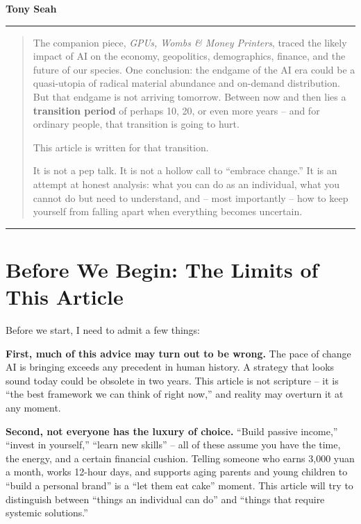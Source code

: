 \textbf{Tony Seah}

\begin{center}\rule{0.5\linewidth}{0.5pt}\end{center}

\begin{quote}
The companion piece, \emph{GPUs, Wombs \& Money Printers}, traced the
likely impact of AI on the economy, geopolitics, demographics, finance,
and the future of our species. One conclusion: the endgame of the AI era
could be a quasi-utopia of radical material abundance and on-demand
distribution. But that endgame is not arriving tomorrow. Between now and
then lies a \textbf{transition period} of perhaps 10, 20, or even more
years -- and for ordinary people, that transition is going to hurt.

This article is written for that transition.

It is not a pep talk. It is not a hollow call to ``embrace change.'' It
is an attempt at honest analysis: what you can do as an individual, what
you cannot do but need to understand, and -- most importantly -- how to
keep yourself from falling apart when everything becomes uncertain.
\end{quote}

\begin{center}\rule{0.5\linewidth}{0.5pt}\end{center}

\section{Before We Begin: The Limits of This
Article}\label{before-we-begin-the-limits-of-this-article}

Before we start, I need to admit a few things:

\textbf{First, much of this advice may turn out to be wrong.} The pace
of change AI is bringing exceeds any precedent in human history. A
strategy that looks sound today could be obsolete in two years. This
article is not scripture -- it is ``the best framework we can think of
right now,'' and reality may overturn it at any moment.

\textbf{Second, not everyone has the luxury of choice.} ``Build passive
income,'' ``invest in yourself,'' ``learn new skills'' -- all of these
assume you have the time, the energy, and a certain financial cushion.
Telling someone who earns 3,000 yuan a month, works 12-hour days, and
supports aging parents and young children to ``build a personal brand''
is a ``let them eat cake'' moment. This article will try to distinguish
between ``things an individual can do'' and ``things that require
systemic solutions.''

